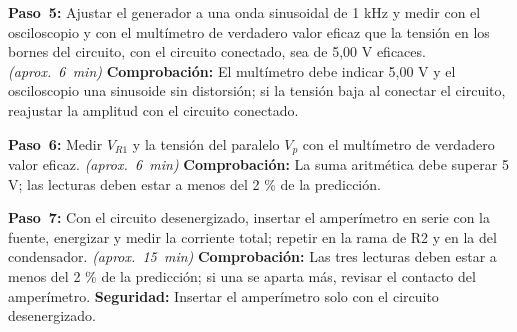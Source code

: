 \documentclass[12pt]{article}
\begin{document}
\begin{pasos}
  \item \textbf{Paso~5:} Ajustar el generador a una onda sinusoidal de 1 kHz y medir con el osciloscopio y con el multímetro de verdadero valor eficaz que la tensión en los bornes del circuito, con el circuito conectado, sea de 5,00 V eficaces. \emph{(aprox.~\SI{6}{\minute})} \textbf{Comprobación:} El multímetro debe indicar 5,00 V y el osciloscopio una sinusoide sin distorsión; si la tensión baja al conectar el circuito, reajustar la amplitud con el circuito conectado.
  \item \textbf{Paso~6:} Medir $V_{R1}$ y la tensión del paralelo $V_p$ con el multímetro de verdadero valor eficaz. \emph{(aprox.~\SI{6}{\minute})} \textbf{Comprobación:} La suma aritmética debe superar 5 V; las lecturas deben estar a menos del 2 \% de la predicción.
  \item \textbf{Paso~7:} Con el circuito desenergizado, insertar el amperímetro en serie con la fuente, energizar y medir la corriente total; repetir en la rama de R2 y en la del condensador. \emph{(aprox.~\SI{15}{\minute})} \textbf{Comprobación:} Las tres lecturas deben estar a menos del 2 \% de la predicción; si una se aparta más, revisar el contacto del amperímetro. \textbf{Seguridad:} Insertar el amperímetro solo con el circuito desenergizado.
\end{pasos}
\end{document}
